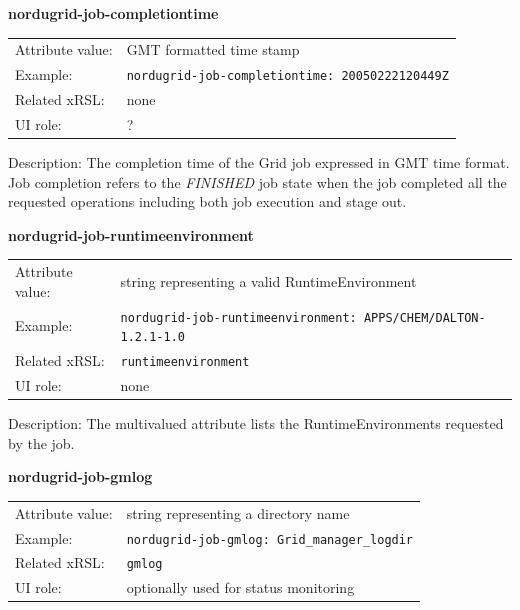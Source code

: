 \documentclass{article}
\begin{document}
  \hspace*{0.5cm}
  \begin{shaded}
    \textbf{nordugrid-job-completiontime}
  \end{shaded}
  \begin{tabular}{lp{10cm}}  
    Attribute value:& GMT formatted time stamp\\
    Example:& \verb#nordugrid-job-completiontime: 20050222120449Z#\\
    Related xRSL:& none\\
    UI role:& ?\\
  \end{tabular}

Description:  The completion time of the Grid job expressed in GMT time format.
Job completion refers to the {\it FINISHED} job state when the job completed 
all the requested operations including both job execution and stage out.


  \hspace*{0.5cm}
  \begin{shaded}
    \textbf{nordugrid-job-runtimeenvironment}
  \end{shaded}
  \begin{tabular}{lp{10cm}}  
    Attribute value:& string representing a valid RuntimeEnvironment\\
    Example:& \verb#nordugrid-job-runtimeenvironment: APPS/CHEM/DALTON-1.2.1-1.0#\\
    Related xRSL:& \verb#runtimeenvironment#\\
    UI role:& none\\
  \end{tabular}

Description: The multivalued attribute lists the RuntimeEnvironments requested by 
the job.


  \hspace*{0.5cm}
  \begin{shaded}
    \textbf{nordugrid-job-gmlog}
  \end{shaded}
  \begin{tabular}{lp{10cm}}  
    Attribute value:& string representing a directory name\\
    Example:& \verb#nordugrid-job-gmlog: Grid_manager_logdir#\\
    Related xRSL:& \verb#gmlog#\\
    UI role:& optionally used for status monitoring\\
  \end{tabular}
\end{document}
